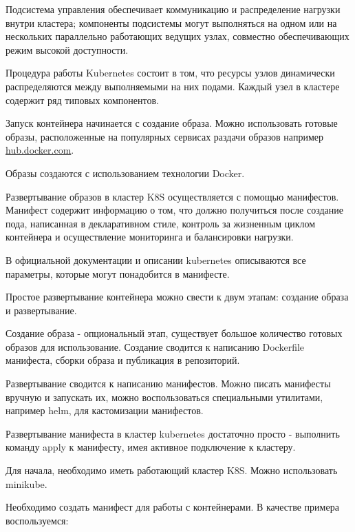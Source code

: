 Подсистема управления обеспечивает коммуникацию и распределение нагрузки внутри кластера; компоненты подсистемы могут выполняться на одном или на нескольких параллельно работающих ведущих узлах, совместно обеспечивающих режим высокой доступности.

Процедура работы Kubernetes состоит в том, что ресурсы узлов динамически распределяются между выполняемыми на них подами. Каждый узел в кластере содержит ряд типовых компонентов.


Запуск контейнера начинается с создание образа. Можно использовать готовые образы, расположенные на популярных сервисах раздачи образов например \href{https://hub.docker.com/}{hub.docker.com}. 

Образы создаются с использованием технологии Docker.

Развертывание образов в кластер K8S осуществляется с помощью манифестов. Манифест содержит информацию о том, что должно получиться после создание пода, написанная в декларативном стиле, контроль за жизненным циклом контейнера и осуществление мониторинга и балансировки нагрузки.

В официальной документации и описании kubernetes описываются все параметры, которые могут понадобится в манифесте.

Простое развертывание контейнера можно свести к двум этапам: создание образа и развертывание.

Создание образа - опциональный этап, существует большое количество готовых образов для использование. Создание сводится к написанию Dockerfile манифеста, сборки образа и публикация в репозиторий.

Развертывание сводится к написанию манифестов. Можно писать манифесты вручную и запускать их, можно воспользоваться специальными утилитами, например helm, для кастомизации манифестов.

Развертывание манифеста в кластер kubernetes достаточно просто - выполнить команду apply к манифесту, имея активное подключение к кластеру.


Для начала, необходимо иметь работающий кластер K8S. Можно использовать minikube.

Необходимо создать манифест для работы с контейнерами. В качестве примера воспользуемся: 

